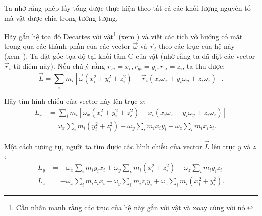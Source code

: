 \noindent
Ta nhớ rằng phép lấy tổng được thực hiện theo tất cả các khối lượng nguyên tố mà vật được chia trong tưởng tượng.

Hãy gắn hệ tọa độ Decartes với vật\footnote{Cần nhấn mạnh rằng các trục của hệ này gắn với vật và xoay cùng với nó.} (xem ) và viết các tích vô hướng có mặt trong  qua các thành phần của các vector $\vec{\omega}$ và $\vec{r}_i$ theo các trục của hệ này (xem~). Ta đặt gốc tọa độ tại khối tâm C của vật (nhớ rằng ta đã đặt các vector $\vec{r}_i$ từ điểm này). Nếu chú ý rằng $r_{xi}=x_i, r_{yi}=y_i, r_{zi}=z_i$, ta thu được:
\begin{equation}\label{eq:5_37}
\vec{L} = \sum_i m_i [\vec{\omega}(x_i^2+y_i^2+z_i^2) - \vec{r}_i(x_i\omega_x+y_i\omega_y+z_i\omega_z)].
\end{equation}

\noindent
Hãy tìm hình chiếu của vector này lên trục $x$:
\begin{align}
L_x &= \sum_i m_i [\omega_x(x_i^2+y_i^2+z_i^2) - x_i(x_i\omega_x+y_i\omega_y+z_i\omega_z)] \nonumber\\
&= \omega_x\sum_i m_i(y_i^2+z_i^2) - \omega_y\sum_i m_i x_i y_i - \omega_z\sum_i m_i x_i z_i.\label{eq:5_38}
\end{align}

\noindent
Một cách tương tự, người ta tìm được các hình chiếu của vector $\vec{L}$ lên trục $y$ và $z$:
\begin{align}
L_y &= -\omega_x\sum_i m_i y_i x_i + \omega_y\sum_i m_i (x_i^2+z_i^2) - \omega_z\sum_i m_i y_i z_i \label{eq:5_39}\\
L_z &= -\omega_x\sum_i m_i z_i x_i - \omega_y\sum_i m_i z_i y_i + \omega_z\sum_i m_i (x_i^2+y_i^2). \label{eq:5_40}
\end{align}

